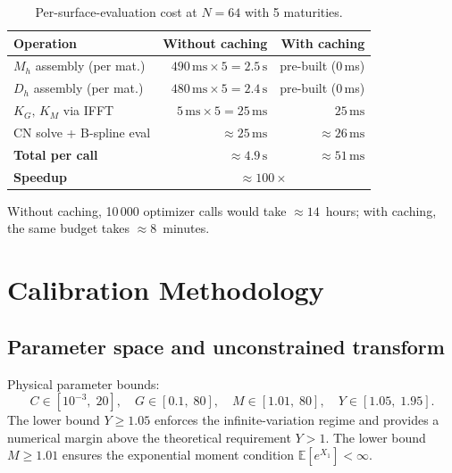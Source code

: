 \documentclass[11pt,a4paper]{article}
\newcommand{\E}{\mathbb{E}}
\begin{document}
\begin{table}[ht]
\centering
\caption{Per-surface-evaluation cost at $N=64$ with 5 maturities.}
\label{tab:caching}
\setlength{\tabcolsep}{8pt}
\begin{tabular}{lrr}
\toprule
Operation & Without caching & With caching \\
\midrule
$M_h$ assembly (per mat.) & $490\,\text{ms} \times 5 = 2.5\,\text{s}$
                           & pre-built (0\,ms) \\
$D_h$ assembly (per mat.) & $480\,\text{ms} \times 5 = 2.4\,\text{s}$
                           & pre-built (0\,ms) \\
$K_G,\,K_M$ via IFFT      & $5\,\text{ms} \times 5  = 25\,\text{ms}$
                           & $25\,\text{ms}$ \\
CN solve + B-spline eval  & $\approx 25\,\text{ms}$  & $\approx 26\,\text{ms}$ \\
\midrule
\textbf{Total per call}   & $\approx 4.9\,\text{s}$  & $\approx 51\,\text{ms}$ \\
\textbf{Speedup}          & \multicolumn{2}{c}{$\approx 100\times$} \\
\bottomrule
\end{tabular}
\end{table}

Without caching, 10\,000 optimizer calls would take $\approx 14$~hours;
with caching, the same budget takes $\approx 8$~minutes.

\section{Calibration Methodology}
\label{sec:calib_method}

\subsection{Parameter space and unconstrained transform}

Physical parameter bounds:
\[
  C \in [10^{-3},\; 20], \quad
  G \in [0.1,\; 80], \quad
  M \in [1.01,\; 80], \quad
  Y \in [1.05,\; 1.95].
\]
The lower bound $Y \ge 1.05$ enforces the infinite-variation regime and
provides a numerical margin above the theoretical requirement $Y > 1$.
The lower bound $M \ge 1.01$ ensures the exponential moment condition
$\E[e^{X_1}] < \infty$.
\end{document}

